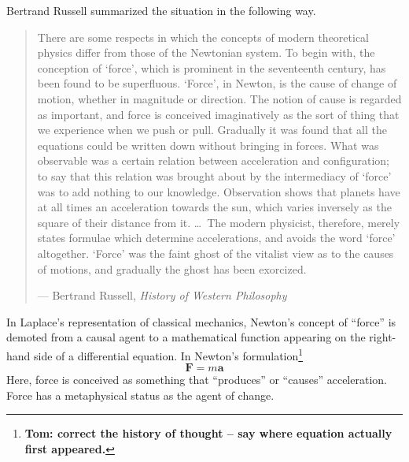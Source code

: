 \documentclass[12pt]{article}
\begin{document}
Bertrand Russell summarized the situation in the following way.

\begin{quote}
There are some respects in which the concepts of modern theoretical physics differ from those of the Newtonian system. To begin with, the conception of `force', which is prominent in the seventeenth century, has been found to be superfluous. `Force', in Newton, is the cause of change of motion, whether in magnitude or direction. The notion of cause is regarded as important, and force is conceived imaginatively as the sort of thing that we experience when we push or pull.
%
%
Gradually it was found that all the equations could be written down without bringing in forces. What was observable was a certain relation between acceleration and configuration; to say that this relation was brought about by the intermediacy of `force' was to add nothing to our knowledge. Observation shows that planets have at all times an acceleration towards the sun, which varies inversely as the square of their distance from it. \ldots\ The modern physicist, therefore, merely states formulae which determine accelerations, and avoids the word `force' altogether. `Force' was the faint ghost of the vitalist view as to the causes of motions, and gradually the ghost has been exorcized.

\medskip
\raggedleft --- Bertrand Russell, \emph{History of Western Philosophy}
\end{quote}



In Laplace's representation of classical mechanics, Newton's concept of ``force'' is demoted from a causal agent to a mathematical function appearing on the right-hand side of a differential equation.
%
%
In Newton's formulation\footnote{\textbf{Tom: correct the history of thought -- say where equation actually first appeared.}}
\[
\mathbf{F} = m\mathbf{a}
\]
Here, force is conceived as something that ``produces'' or ``causes'' acceleration. Force has a metaphysical status as the agent of change.
\end{document}
